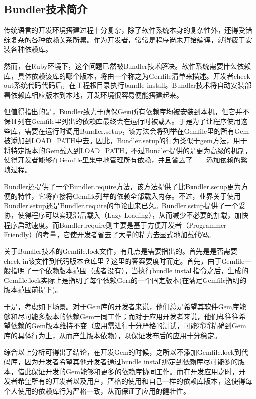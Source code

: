\subsection{Bundler技术简介}
传统语言的开发环境搭建过程十分复杂，除了软件系统本身的复杂性外，还得受错综复杂的各种依赖关系所累。作为开发者，常常是程序尚未开始编译，就得疲于安装各种依赖库。

然而，在Ruby环境下，这个问题已然被Bundler技术解决。软件系统需要什么依赖库，具体依赖该库的哪个版本，将由一个称之为Gemfile清单来描述。开发者check out系统代码代码后，在工程根目录执行bundle install。Bundler技术将自动安装部署依赖库相应版本到本地，开发环境很容易便能搭建起来。

但值得指出的是，Bundler致力于确保Gem所有依赖库均被安装到本机，但它并不保证列在Gemfile里列出的依赖库最终会在运行时被载入。于是为了让程序使用这些库，需要在运行时调用Bundler.setup，该方法会将列举在Gemfile里的所有Gem被添加到LOAD\_PATH中去。因此，Bundler.setup的行为类似于gem方法，用于将特定版本的Gem载入到LOAD\_PATH。不过Bundler提供的是更为高级的机制，使得开发者能够在Gemfile里集中地管理所有依赖，并且省去了一一添加依赖的繁琐过程。

Bundler还提供了一个Bundler.require方法，该方法提供了比Bundler.setup更为方便的特性，它将直接将Gemfile列举的依赖全部载入内存。不过，业界关于使用Bundler.setup还是Bundler.require的争论由来已久。Bundler.setup提供了一个妥协，使得程序可以实现滞后载入（Lazy Loading），从而减少不必要的加载，加快程序启动速度。而Bundler.require则主要是基于方便开发者（Programmer Friendly）的考量，它使开发者省去了大量的精力去显式地加载代码。

关于Bundler技术的Gemfile.lock文件，有几点是需要指出的。首先是是否需要check in该文件到代码版本仓库里？这里的答案要度时而定。首先，由于Gemfile一般指明了一个依赖版本范围（或者没有），当执行bundle install指令之后，生成的Gemfile.lock实际上是指明了每个依赖Gem的一个固定版本(在满足Gemfile指明的版本范围前提下)。

于是，考虑如下场景。对于Gem库的开发者来说，他们总是希望其软件Gem库能够和尽可能多版本的依赖Gem一同工作；而对于应用开发者来说，他们却往往希望依赖的Gem版本维持不变（应用需进行十分严格的测试，可能将将精确到Gem库的具体行为上，从而产生版本依赖），以保证发布后的应用十分稳定。

综合以上分析可得出了结论，在开发Gem的时候，之所以不添加Gemfile.lock到代码库，因为开发者希望其他开发者通过bundle install绑定到依赖库尽可能多的版本，借此保证开发的Gem能够和更多的依赖库协同工作。而在开发应用之时，开发者希望所有的开发者以及用户，严格的使用和自己一样的依赖库版本，这使得每个人使用的依赖库行为严格一致，从而保证了应用的健壮性。

